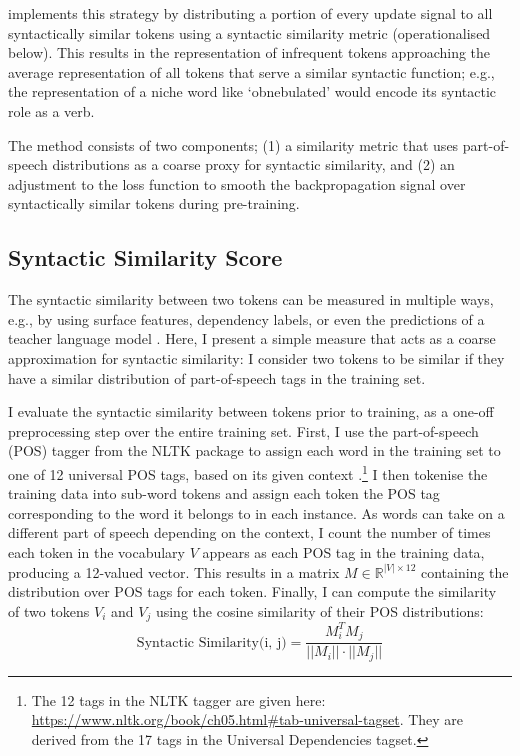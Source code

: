 \smoothing implements this strategy by distributing a portion of every update signal to all syntactically similar tokens using a syntactic similarity metric (operationalised below). This results in the representation of infrequent tokens approaching the average representation of all tokens that serve a similar syntactic function; e.g., the representation of a niche word like `obnebulated' would encode its syntactic role as a verb.

The \smoothing method consists of two components; (1) a similarity metric that uses part-of-speech distributions as a coarse proxy for syntactic similarity, and (2) an adjustment to the loss function to smooth the backpropagation signal over syntactically similar tokens during pre-training. 

\subsection{Syntactic Similarity Score}\label{sec:sim}

The syntactic similarity between two tokens can be measured in multiple ways, e.g., by using surface features, dependency labels, or even the predictions of a teacher language model \citep{hinton2015distilling}. Here, I present a simple measure that acts as a coarse approximation for syntactic similarity: I consider two tokens to be similar if they have a similar distribution of part-of-speech tags in the training set.

I evaluate the syntactic similarity between tokens prior to training, as a one-off preprocessing step over the entire training set. First, I use the part-of-speech (POS) tagger from the NLTK package \citep{bird2009natural} to assign each word in the training set to one of 12 universal POS tags, based on its given context \citep{petrov2012universalpos}.\footnote{The 12 tags in the NLTK tagger are given here: \url{https://www.nltk.org/book/ch05.html\#tab-universal-tagset}. They are derived from the 17 tags in the Universal Dependencies tagset.} I then tokenise the training data into sub-word tokens and assign each token the POS tag corresponding to the word it belongs to in each instance. As words can take on a different part of speech depending on the context, I count the number of times each token in the vocabulary $V$ appears as each POS tag in the training data, producing a 12-valued vector. This results in a matrix $M \in \mathbb{R}^{|V|\times 12}$ containing the distribution over POS tags for each token. Finally, I can compute the similarity of two tokens $V_i$ and $V_j$ using the cosine similarity of their POS distributions: $$ \text{Syntactic Similarity(i, j)} = \frac{M_i^TM_j}{||M_i|| \cdot ||M_j||}$$ 



